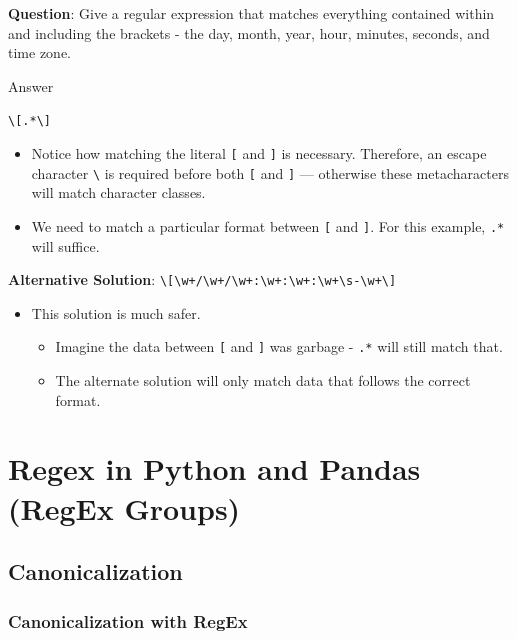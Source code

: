 \documentclass[
  letterpaper,
  DIV=11,
  numbers=noendperiod]{scrreprt}
\providecommand{\tightlist}{%
  \setlength{\itemsep}{0pt}\setlength{\parskip}{0pt}}\usepackage{longtable,booktabs,array}
\begin{document}
\textbf{Question}: Give a regular expression that matches everything
contained within and including the brackets - the day, month, year,
hour, minutes, seconds, and time zone.

Answer

\texttt{\textbackslash{}{[}.*\textbackslash{}{]}}

\begin{itemize}
\tightlist
\item
  Notice how matching the literal \texttt{{[}} and \texttt{{]}} is
  necessary. Therefore, an escape character \texttt{\textbackslash{}} is
  required before both \texttt{{[}} and \texttt{{]}} --- otherwise these
  metacharacters will match character classes.
\item
  We need to match a particular format between \texttt{{[}} and
  \texttt{{]}}. For this example, \texttt{.*} will suffice.
\end{itemize}

\textbf{Alternative Solution}:
\texttt{\textbackslash{}{[}\textbackslash{}w+/\textbackslash{}w+/\textbackslash{}w+:\textbackslash{}w+:\textbackslash{}w+:\textbackslash{}w+\textbackslash{}s-\textbackslash{}w+\textbackslash{}{]}}

\begin{itemize}
\tightlist
\item
  This solution is much safer.

  \begin{itemize}
  \tightlist
  \item
    Imagine the data between \texttt{{[}} and \texttt{{]}} was garbage -
    \texttt{.*} will still match that.
  \item
    The alternate solution will only match data that follows the correct
    format.
  \end{itemize}
\end{itemize}

\section{Regex in Python and Pandas (RegEx
Groups)}\label{regex-in-python-and-pandas-regex-groups}

\subsection{Canonicalization}\label{canonicalization-1}

\subsubsection{Canonicalization with
RegEx}\label{canonicalization-with-regex}
\end{document}
